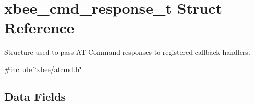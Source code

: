 \hypertarget{structxbee__cmd__response__t}{}\section{xbee\+\_\+cmd\+\_\+response\+\_\+t Struct Reference}
\label{structxbee__cmd__response__t}


Structure used to pass AT Command responses to registered callback handlers.  




{\ttfamily \#include \char`\"{}xbee/atcmd.\+h\char`\"{}}

\subsection*{Data Fields}
